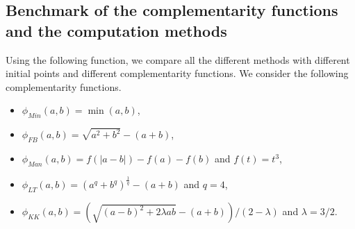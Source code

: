 \documentclass[11pt, a4paper]{article}
\begin{document}
\subsection{Benchmark of the complementarity functions and the computation methods}
Using the following function, we compare all the different methods with different initial points and different complementarity functions.
We consider the following complementarity functions.
\begin{itemize}
\item $\phi_{Min}(a,b)=\min(a,b)$,
\item $\phi_{FB}(a,b)=\sqrt{a^2+b^2} -(a+b)$,
\item $\phi_{Man}(a,b)=f(|a-b|) - f(a) - f(b)$ and $f(t)=t^3$,
\item $\phi_{LT}(a,b)=(a^q+b^q)^{\frac{1}{q}} -(a+b)$ and $q=4$,
\item $\phi_{KK}(a,b)= (\sqrt{(a-b)^2+2\lambda a b} -(a+b))/(2-\lambda)$ and $\lambda=3/2$.
\end{itemize}
%
%
%
%
%
%
%
\end{document}
